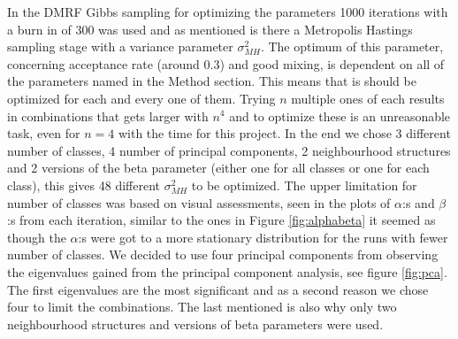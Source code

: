 \documentclass[a4paper,english]{article}
\begin{document}
In the DMRF Gibbs sampling for optimizing the parameters 1000 iterations with a burn in of 300 was used and as mentioned is there a Metropolis Hastings sampling stage with a variance parameter  $\sigma_{MH}^2$.
The optimum of this parameter, concerning acceptance rate (around $0.3$) and good mixing, is dependent on all of the parameters named in the Method section.
This means that is should be optimized for each and every one of them.
Trying $n$ multiple ones of each results in combinations that gets larger with $n^4$ and to optimize these is an unreasonable task, even for $n=4$ with the time for this project.
In the end we chose 3 different number of classes, 4 number of principal components, 2 neighbourhood structures and 2 versions of the beta parameter (either one for all classes or one for each class), this gives 48 different $\sigma_{MH}^2$ to be optimized.
The upper limitation for number of classes was based on visual assessments, seen in the plots of $\alpha$:s and $\beta$:s from each iteration, similar to the ones in Figure \ref{fig:alphabeta} it seemed as though the $\alpha$:s were got to a more stationary distribution for the runs with fewer number of classes.
We decided to use four principal components from observing the eigenvalues gained from the principal component analysis, see figure \ref{fig:pca}. The first eigenvalues are the most significant and as a second reason we chose four to limit the combinations. The last mentioned is also why only two neighbourhood structures and versions of beta parameters were used.
\end{document}
